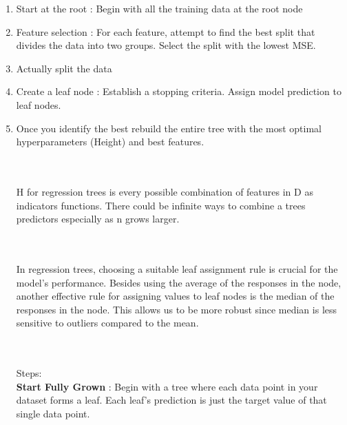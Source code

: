 \documentclass[12pt]{article}
\begin{document}

\begin{enumerate}
 \\ \\ 

\item Start at the root : Begin with all the training data at the root node
\item Feature selection : For each feature, attempt to find the best split that divides the data into two groups. Select the split with the lowest MSE.
\item Actually split the data
\item Create a leaf node : Establish a stopping criteria. Assign model prediction to leaf nodes. 
\item Once you identify the best rebuild the entire tree with the most optimal hyperparameters (Height) and best features. 

 \\ \\ 
H for regression trees is every possible combination of features in D as indicators functions. There could be infinite ways to combine a trees predictors especially as n grows larger. 

 \\ \\ 
In regression trees, choosing a suitable leaf assignment rule is crucial for the model's performance. Besides using the average of the responses in the node, another effective rule for assigning values to leaf nodes is the median of the responses in the node. This allows us to be more robust since median is less sensitive to outliers compared to the mean. 

 \\ \\ 
Steps: \\ 
\textbf{Start Fully Grown} : Begin with a tree where each data point in your dataset forms a leaf. Each leaf’s prediction is just the target value of that single data point.


\end{enumerate}
\end{document}
